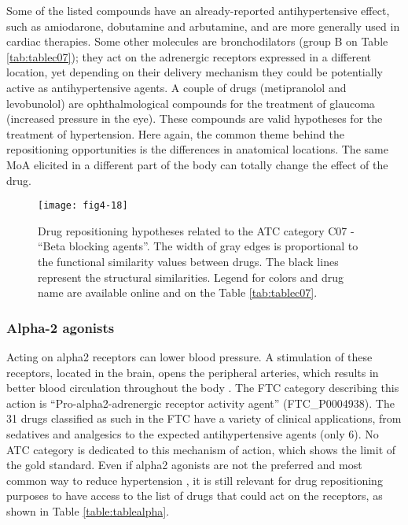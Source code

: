 Some of the listed compounds have an already-reported antihypertensive effect, such as amiodarone, dobutamine and arbutamine, and are more generally used in cardiac therapies. Some other molecules are bronchodilators (group B on Table \ref{tab:tablec07}); they act on the adrenergic receptors expressed in a different location, yet depending on their delivery mechanism they could be potentially active as antihypertensive agents. A couple of drugs (metipranolol and levobunolol) are ophthalmological compounds for the treatment of glaucoma (increased pressure in the eye). These compounds are valid hypotheses for the treatment of hypertension. Here again, the common theme behind the repositioning opportunities is the differences in anatomical locations. The same MoA elicited in a different part of the body can totally change the effect of the drug.

\begin{figure}[H]
    \centering
    \texttt{[image: fig4-18]}
    \caption{Drug repositioning hypotheses related to the ATC category C07 - “Beta blocking agents”. The width of gray edges is proportional to the functional similarity values between drugs. The black lines represent the structural similarities. Legend for colors and drug name are available online and on the Table \ref{tab:tablec07}.}
    \label{fig4-18}
\end{figure}

\subsubsection{Alpha-2 agonists}
Acting on alpha2 receptors can lower blood pressure. A stimulation of these receptors, located in the brain, opens the peripheral arteries, which results in better blood circulation throughout the body \citep{swedberg2005task}. The FTC category describing this action is “Pro-alpha2-adrenergic receptor activity agent” (FTC\_P0004938). The 31 drugs classified as such in the FTC have a variety of clinical applications, from sedatives and analgesics to the expected antihypertensive agents (only 6).
No ATC category is dedicated to this mechanism of action, which shows the limit of the gold standard. Even if alpha2 agonists are not the preferred and most common way to reduce hypertension \citep{nelson2010drug}, it is still relevant for drug repositioning purposes to have access to the list of drugs that could act on the receptors, as shown in Table \ref{table:tablealpha}.

